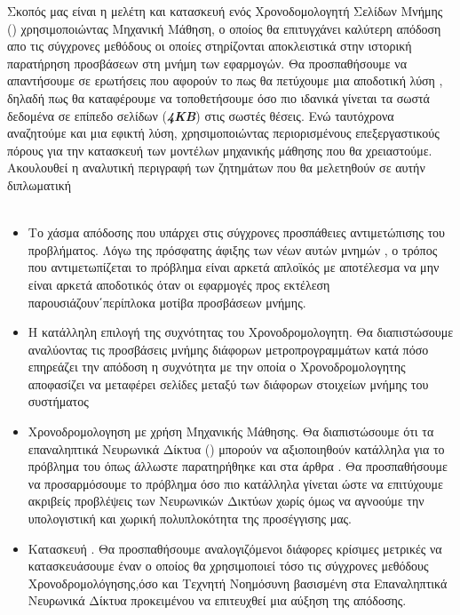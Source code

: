 Σκοπός μας είναι η μελέτη και κατασκευή ενός Χρονοδομολογητή Σελίδων Μνήμης () χρησιμοποιώντας Μηχανική Μάθηση, ο  οποίος θα επιτυγχάνει καλύτερη απόδοση απο τις σύγχρονες μεθόδους οι οποίες στηρίζονται αποκλειστικά στην ιστορική παρατήρηση προσβάσεων στη μνήμη των εφαρμογών. Θα προσπαθήσουμε να απαντήσουμε σε ερωτήσεις που αφορούν το πως θα πετύχουμε μια αποδοτική λύση , δηλαδή πως θα καταφέρουμε να τοποθετήσουμε όσο πιο ιδανικά γίνεται τα σωστά δεδομένα σε επίπεδο σελίδων (\emph{\textbf{4KB}}) στις σωστές θέσεις. Ενώ ταυτόχρονα αναζητούμε και μια εφικτή λύση, χρησιμοποιώντας περιορισμένους επεξεργαστικούς πόρους για την κατασκευή των μοντέλων μηχανικής μάθησης που θα χρειαστούμε. Ακουλουθεί η αναλυτική περιγραφή των ζητημάτων που θα μελετηθούν σε αυτήν διπλωματική
\\
\\
\begin{itemize}
    \item Το χάσμα απόδοσης που υπάρχει στις σύγχρονες προσπάθειες αντιμετώπισης του προβλήματος. Λόγω της πρόσφατης άφιξης των νέων αυτών μνημών , ο τρόπος που αντιμετωπίζεται το πρόβλημα είναι αρκετά απλοϊκός με αποτέλεσμα να μην είναι αρκετά αποδοτικός όταν οι εφαρμογές προς εκτέλεση παρουσιάζουν΄περίπλοκα μοτίβα προσβάσεων μνήμης.
    \item Η κατάλληλη επιλογή της συχνότητας του Χρονοδρομολογητη. Θα διαπιστώσουμε αναλύοντας τις προσβάσεις μνήμης διάφορων μετροπρογραμμάτων κατά πόσο επηρεάζει την απόδοση η συχνότητα με την οποία ο Χρονοδρομολογητης αποφασίζει να μεταφέρει σελίδες μεταξύ των διάφορων στοιχείων μνήμης του συστήματος
    \item Χρονοδρομολογηση με χρήση Μηχανικής Μάθησης. Θα διαπιστώσουμε ότι τα επαναληπτικά Νευρωνικά Δίκτυα () μπορούν να αξιοποιηθούν κατάλληλα για το πρόβλημα του  όπως άλλωστε παρατηρήθηκε και στα άρθρα  \cite{hashemi2018learning,10.1145/3307681.3325398}. Θα προσπαθήσουμε να προσαρμόσουμε το πρόβλημα όσο πιο κατάλληλα γίνεται ώστε να επιτύχουμε ακριβείς προβλέψεις των Νευρωνικών Δικτύων χωρίς όμως να αγνοούμε την υπολογιστική και χωρική πολυπλοκότητα της προσέγγισης μας.
    \item Κατασκευή  . Θα προσπαθήσουμε αναλογιζόμενοι διάφορες κρίσιμες μετρικές να κατασκευάσουμε έναν  ο οποίος θα χρησιμοποιεί τόσο τις σύγχρονες μεθόδους  Χρονοδρομολόγησης,όσο και Τεχνητή Νοημόσυνη βασισμένη στα Επαναληπτικά Νευρωνικά Δίκτυα προκειμένου να επιτευχθεί μια αύξηση της απόδοσης.
\end{itemize}




